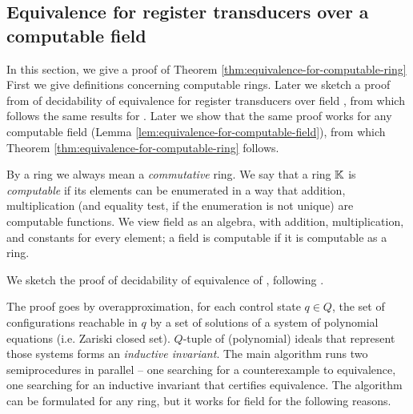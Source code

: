 \subsection{Equivalence for register transducers over a computable field}\label{sec:pol-transducers-any-ring}


In this section, we give a proof of Theorem \ref{thm:equivalence-for-computable-ring}%
\thmequivalenceComputableRing*
First we give definitions concerning computable rings. Later we sketch a proof from \cite[Theorem 6.6]{seidlManethKemper2018} of decidability of equivalence for register transducers over field \Q, from which follows the same results for \Z. Later we show that the same proof works for any computable field (Lemma \ref{lem:equivalence-for-computable-field}), from which Theorem \ref{thm:equivalence-for-computable-ring} follows.

By a ring we always mean a \emph{commutative} ring.
We say that a ring ${\mathbb K}$ is \emph{computable} if its elements can be enumerated in a way that addition, multiplication (and equality test, if the enumeration is not unique) are computable functions. %
We view field as an algebra, with addition, multiplication, and constants for every element; a field is computable if it is computable as a ring.


We sketch the proof of decidability of equivalence of \polTsover{\Q}, following \cite{seidlManethKemper2018}.

The proof goes by overapproximation, for each control state $q \in Q$, the set of configurations reachable in $q$ by a set of solutions of a system of polynomial equations (i.e. Zariski closed set).
$Q$-tuple of (polynomial) ideals that represent those systems forms an \emph{inductive invariant}.
The main algorithm runs two semiprocedures in parallel -- one searching for a counterexample to equivalence, one searching for an inductive invariant that certifies equivalence. The algorithm can be formulated for any ring, %
but it works for field \Q for the following reasons.

